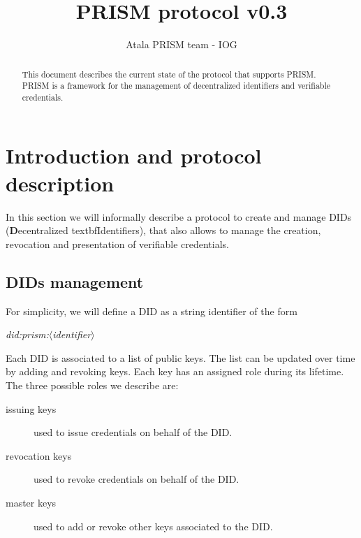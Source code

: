 \documentclass[10pt,a4paper]{article}
\title{PRISM protocol v0.3}
\author{Atala PRISM team - IOG}
\date{}
\begin{document}
\maketitle 

\begin{abstract} 
This document describes the current state of the protocol that supports PRISM. PRISM is a framework for the management of decentralized identifiers and verifiable credentials. 
\end{abstract}

\setcounter{tocdepth}{3} 

\tableofcontents 
\newpage 


\section{Introduction and protocol description}

In this section we will informally describe a protocol to create and manage DIDs (\textbf{D}ecentralized textbf{Id}entifiers), that also allows to manage the creation, revocation and presentation of verifiable credentials.

\subsection{DIDs management}

For simplicity, we will define a DID as a string identifier of the form 

\begin{center}
	\emph{did:prism:$\langle$identifier$\rangle$}
\end{center}

Each DID is associated to a list of public keys. The list can be updated over time by adding and revoking keys. Each key has an assigned role during its lifetime. The three possible roles we describe are:

\begin{description}
\item[issuing keys] used to issue credentials on behalf of the DID.
\item[revocation keys] used to revoke credentials on behalf of the DID.
\item[master keys] used to add or revoke other keys associated to the DID.
\end{description}
\end{document}

